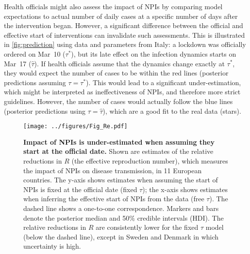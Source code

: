 \documentclass[12pt]{extarticle}
\begin{document}
Health officials might also assess the impact of NPIs by comparing model expectations to actual number of daily cases at a specific number of days after the intervention began. 
However, a significant difference between the official and effective start of interventions can invalidate such assessments.
This is illustrated in \autoref{fig:prediction} using data and parameters from Italy: a lockdown was officially ordered on Mar~10 ($\tau^*$), but its late effect on the infection dynamics starts on Mar~17 ($\hat{\tau}$).
If health officials assume that the dynamics change exactly at $\tau^*$, they would expect the number of cases to be within the red lines (posterior predictions assuming $\tau=\tau^*$).
This would lead to a significant under-estimation, which might be interpreted as ineffectiveness of NPIs, and therefore more strict guidelines.
However, the number of cases would actually follow the blue lines (posterior predictions using $\tau=\hat{\tau}$), which are a good fit to the real data (stars).



\begin{figure}[h]
    \centering
	\texttt{[image: ../figures/Fig\_Re.pdf]}
    \caption{
    \textbf{Impact of NPIs is under-estimated when assuming they start at the official date.}
    Shown are estimates of the relative reductions in $R$ (the effective reproduction number), which measures the impact of NPIs on disease transmission, in 11 European countries.
     The y-axis shows estimates when assuming the start of NPIs is fixed at the official date (fixed $\tau$); the x-axis shows estimates when inferring the effective start of NPIs from the data (free $\tau$). The dashed line shows a one-to-one correspondence.
     Markers and bars denote the posterior median and 50\% credible intervals (HDI).
    The relative reductions in $R$ are consistently lower for the fixed $\tau$ model (below the dashed line), except in Sweden and Denmark in which uncertainty is high.
    } 
    \label{fig:Re}
\end{figure}
\end{document}
